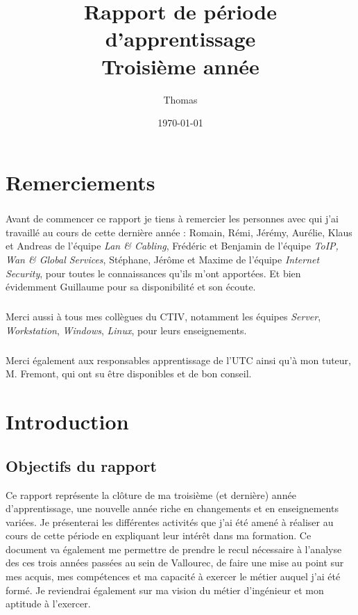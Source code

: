 \documentclass[a4paper,12pt]{report}
\title{\textbf{Rapport de période d'apprentissage} \\Troisième année}
\author{Thomas \bsc{kieffer}}
\date{\today}
\begin{document}
\stagepdtitre
\restoregeometry
\onehalfspacing
\tableofcontents

\chapter{Remerciements}
\paragraph{}
Avant de commencer ce rapport je tiens à remercier les personnes avec qui j'ai travaillé au cours de cette dernière année : Romain, Rémi, Jérémy, Aurélie, Klaus et Andreas de l'équipe \textit{Lan \& Cabling}, Frédéric et Benjamin de l'équipe \textit{ToIP, Wan \& Global Services}, Stéphane, Jérôme et Maxime de l'équipe \textit{Internet Security}, pour toutes le connaissances qu'ils m'ont apportées. Et bien évidemment Guillaume pour sa disponibilité et son écoute.

\paragraph{}
Merci aussi à tous mes collègues du CTIV, notamment les équipes \textit{Server}, \textit{Workstation}, \textit{Windows}, \textit{Linux}, pour leurs enseignements.

\paragraph{}
Merci également aux responsables apprentissage de l'UTC  ainsi qu'à mon tuteur, M. Fremont, qui ont su être disponibles et de bon conseil.

\chapter{Introduction}
\section{Objectifs du rapport}
Ce rapport représente la clôture de ma troisième (et dernière) année d'apprentissage, une nouvelle année riche en changements et en enseignements variées. Je présenterai les différentes activités que j'ai été amené à réaliser au cours de cette période en expliquant leur intérêt dans ma formation. Ce document va également me permettre de prendre le recul nécessaire à l'analyse des ces trois années passées au sein de Vallourec, de faire une mise au point sur mes acquis, mes compétences et ma capacité à exercer le métier auquel j'ai été formé. Je reviendrai également sur ma vision du métier d'ingénieur et mon aptitude à l'exercer.
\end{document}
